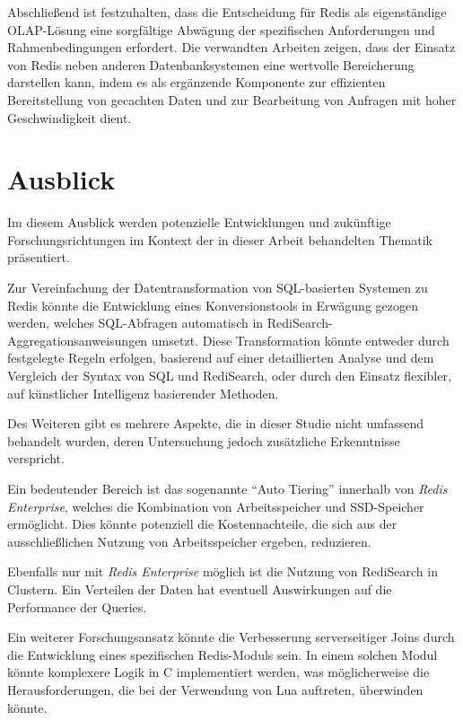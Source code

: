 Abschließend ist festzuhalten, dass die Entscheidung für Redis als eigenständige OLAP-Lösung eine sorgfältige Abwägung der spezifischen Anforderungen und Rahmenbedingungen erfordert. Die verwandten Arbeiten zeigen, dass der Einsatz von Redis neben anderen Datenbanksystemen eine wertvolle Bereicherung darstellen kann, indem es als ergänzende Komponente zur effizienten Bereitstellung von gecachten Daten und zur Bearbeitung von Anfragen mit hoher Geschwindigkeit dient. 

\section{Ausblick}
Im diesem Ausblick werden potenzielle Entwicklungen und zukünftige Forschungsrichtungen im Kontext der in dieser Arbeit behandelten Thematik präsentiert.

Zur Vereinfachung der Datentransformation von SQL-basierten Systemen zu Redis könnte die Entwicklung eines Konversionstools in Erwägung gezogen werden, welches SQL-Abfragen automatisch in RediSearch-Aggregationsanweisungen umsetzt. Diese Transformation könnte entweder durch festgelegte Regeln erfolgen, basierend auf einer detaillierten Analyse und dem Vergleich der Syntax von SQL und RediSearch, oder durch den Einsatz flexibler, auf künstlicher Intelligenz basierender Methoden.

Des Weiteren gibt es mehrere Aspekte, die in dieser Studie nicht umfassend behandelt wurden, deren Untersuchung jedoch zusätzliche Erkenntnisse verspricht.

Ein bedeutender Bereich ist das sogenannte \enquote{Auto Tiering} innerhalb von \emph{Redis Enterprise}, welches die Kombination von Arbeitsspeicher und SSD-Speicher ermöglicht. Dies könnte potenziell die Kostennachteile, die sich aus der ausschließlichen Nutzung von Arbeitsspeicher ergeben, reduzieren.

Ebenfalls nur mit \emph{Redis Enterprise} möglich ist die Nutzung von RediSearch in Clustern. Ein Verteilen der Daten hat eventuell Auswirkungen auf die Performance der Queries.

Ein weiterer Forschungsansatz könnte die Verbesserung serverseitiger Joins durch die Entwicklung eines spezifischen Redis-Moduls sein. In einem solchen Modul könnte komplexere Logik in C implementiert werden, was möglicherweise die Herausforderungen, die bei der Verwendung von Lua auftreten, überwinden könnte.
